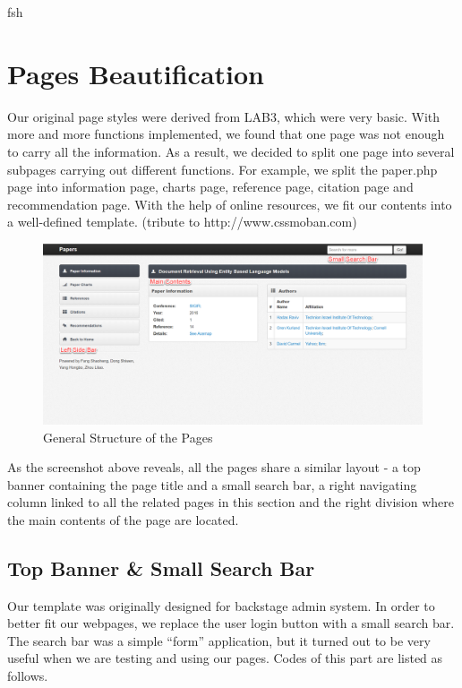 \documentclass{book}
\begin{document}
fsh

\section {Pages Beautification}

Our original page styles were derived from LAB3, which were very basic. With more and more functions implemented, we found that one page was not enough to carry all the information. As a result, we decided to split one page into several subpages carrying out different functions. For example, we split the paper.php page into information page, charts page, reference page, citation page and recommendation page. With the help of online resources, we fit our contents into a well-defined template. (tribute to http://www.cssmoban.com)


\begin{figure}[H]
\centering{}
\includegraphics[scale=0.35]{img/zlt_beau_demo.png}
\caption{General Structure of the Pages}
\end{figure}

As the screenshot above reveals, all the pages share a similar layout - a top banner containing the page title and a small search bar, a right navigating column linked to all the related pages in this section and the right division where the main contents of the page are located.

\subsection {Top Banner \& Small Search Bar}

Our template was originally designed for backstage admin system. In order to better fit our webpages, we replace the user login button with a small search bar. The search bar was a simple ``form'' application, but it turned out to be very useful when we are testing and using our pages. Codes of this part are listed as follows.
\end{document}
